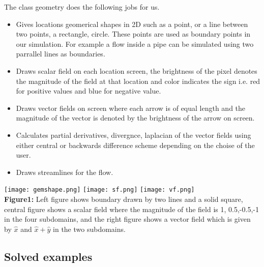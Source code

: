 \documentclass{article}		%
\begin{document}
\newpage

The class geometry does the following jobs for us.

\begin{itemize}
	\item Gives locations geomerical shapes in 2D such as a point, or a line between two points, a rectangle, circle. These points are used as boundary points in our simulation. For example a flow inside a pipe can be simulated using two parrallel lines as boundaries. 
	\item Draws scalar field on each location screen, the brightness of the pixel denotes the magnitude of the field at that location and color indicates the sign i.e. red for positive values and blue for negative value. 
	\item Draws vector fields on screen where each arrow is of equal length and the magnitude of the vector is denoted by the brightness of the arrow on screen. 
	\item Calculates partial derivatives, divergnce, laplacian of the vector fields using either central or backwards difference scheme depending on the choise of the user.
    \item Draws streamlines for the flow.		  
\end{itemize}

\begin{center}
\texttt{[image: gemshape.png]}
\texttt{[image: sf.png]}
\texttt{[image: vf.png]}\\
 \textbf{Figure1:} Left figure shows boundary drawn by two lines and a solid square, central figure shows a scalar field where the magnitude of the field is 1, 0.5,-0.5,-1 in the four subdomains, and the right figure shows a vector field which is given by $\hat{x}$ and $\hat{x} + \hat{y}$ in the two subdomains.
\end{center}

\subsection{Solved examples}
\end{document}
